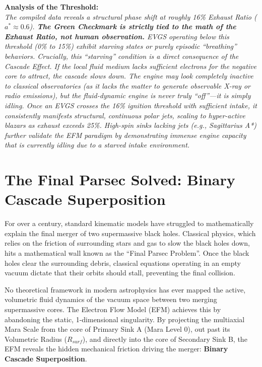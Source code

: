 \documentclass[11pt, a4paper]{article}
\begin{document}
\begin{landscape}
\vspace{1em}
\noindent \textbf{Analysis of the Threshold:}\\
\textit{The compiled data reveals a structural phase shift at roughly 16\% Exhaust Ratio ($a^* \approx 0.6$). \textbf{The Green Checkmark is strictly tied to the math of the Exhaust Ratio, not human observation.} EVGS operating below this threshold (0\% to 15\%) exhibit starving states or purely episodic ``breathing'' behaviors. Crucially, this ``starving'' condition is a direct consequence of the Cascade Effect. If the local fluid medium lacks sufficient electrons for the negative core to attract, the cascade slows down. The engine may look completely inactive to classical observatories (as it lacks the matter to generate observable X-ray or radio emissions), but the fluid-dynamic engine is never truly ``off''---it is simply idling. Once an EVGS crosses the 16\% ignition threshold with sufficient intake, it consistently manifests structural, continuous polar jets, scaling to hyper-active blazars as exhaust exceeds 25\%. High-spin sinks lacking jets (e.g., Sagittarius A*) further validate the EFM paradigm by demonstrating immense engine capacity that is currently idling due to a starved intake environment.}
\end{landscape}

\clearpage
\section{The Final Parsec Solved: Binary Cascade Superposition}

For over a century, standard kinematic models have struggled to mathematically explain the final merger of two supermassive black holes. Classical physics, which relies on the friction of surrounding stars and gas to slow the black holes down, hits a mathematical wall known as the ``Final Parsec Problem''. Once the black holes clear the surrounding debris, classical equations operating in an empty vacuum dictate that their orbits should stall, preventing the final collision.

No theoretical framework in modern astrophysics has ever mapped the active, volumetric fluid dynamics of the vacuum space between two merging supermassive cores. The Electron Flow Model (EFM) achieves this by abandoning the static, 1-dimensional singularity. By projecting the multiaxial Mara Scale from the core of Primary Sink A (Mara Level 0), out past its Volumetric Radius ($R_{surf}$), and directly into the core of Secondary Sink B, the EFM reveals the hidden mechanical friction driving the merger: \textbf{Binary Cascade Superposition}.
\end{document}
